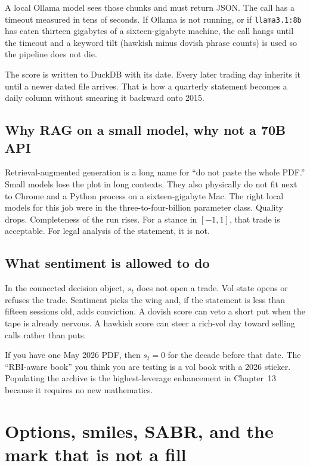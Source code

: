 \documentclass[11pt,a4paper]{article}
\begin{document}
A local Ollama model sees those chunks and must return JSON. The call has a timeout measured in tens of seconds. If Ollama is not running, or if \texttt{llama3.1:8b} has eaten thirteen gigabytes of a sixteen-gigabyte machine, the call hangs until the timeout and a keyword tilt (hawkish minus dovish phrase counts) is used so the pipeline does not die.

The score is written to DuckDB with its date. Every later trading day inherits it until a newer dated file arrives. That is how a quarterly statement becomes a daily column without smearing it backward onto 2015.

\subsection{Why RAG on a small model, why not a 70B API}

Retrieval-augmented generation is a long name for ``do not paste the whole PDF.'' Small models lose the plot in long contexts. They also physically do not fit next to Chrome and a Python process on a sixteen-gigabyte Mac. The right local models for this job were in the three-to-four-billion parameter class. Quality drops. Completeness of the run rises. For a stance in $[-1,1]$, that trade is acceptable. For legal analysis of the statement, it is not.

\subsection{What sentiment is allowed to do}

In the connected decision object, $s_t$ does not open a trade. Vol state opens or refuses the trade. Sentiment picks the wing and, if the statement is less than fifteen sessions old, adds conviction. A dovish score can veto a short put when the tape is already nervous. A hawkish score can steer a rich-vol day toward selling calls rather than puts.

If you have one May 2026 PDF, then $s_t=0$ for the decade before that date. The ``RBI-aware book'' you think you are testing is a vol book with a 2026 sticker. Populating the archive is the highest-leverage enhancement in Chapter~13 because it requires no new mathematics.

\section{Options, smiles, SABR, and the mark that is not a fill}
\label{ch:opt}
\end{document}
